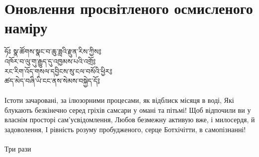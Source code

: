 \newpage

\section{Оновлення просвітленого осмисленого наміру}

\ti
ཧོཿ སྣ་ཚོགས་སྣང་བ་ཆུ་ཟླའི་རྫུན་རིས་ཀྱིས༔\\
འཁོར་བ་ལུ་གུ་རྒྱུད་དུ་འཁྱམས་པའི་འགྲོ༔\\
རང་རིག་འོད་གསལ་དབྱིངས་སུ་ངལ་བསོའི་ཕྱིར༔\\
ཚད་མེད་བཞི་ཡི་ངང་ནས་སེམས་བསྐྱེད་དོ༔\\
\\
\ru
Істоти зачаровані, за ілюзорними процесами, як відблиск місяця в воді,
Які блукають безкінечно серед гріхів самсари у омані та пітьмі!
Щоб відпочили ви у власнім просторі сам'усвідомлення,
Любов безмежну активую вже, і милосердя, й задоволення,
І рівність розуму пробудженого, серце Ботхічітти, в самопізнанні!\\
\\
Три рази\\
